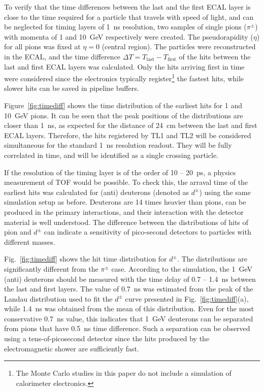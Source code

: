 \documentclass[final,1p,11pt]{elsarticle}
\begin{document}
To verify that the time differences between the last and the first ECAL layer is close to the time
required for a particle that travels with speed of light, and can be neglected for timing layers of 1~ns resolution,
  two samples of single pions ($\pi^\pm$) with momenta of 1 and 10~GeV respectively were created. The
 pseudorapidity ($\eta$) for all pions was fixed at $\eta=0$ (central region). 
The particles were reconstructed in the ECAL, and the time difference $\Delta T= T_{\mathrm{last}}-T_{\mathrm{first}}$ of the hits 
 between the last and first ECAL layers was calculated.
Only the hits arriving first in time were considered since the electronics typically register\footnote{The Monte Carlo studies in
 this paper do not include a simulation of calorimeter electronics.} the fastest hits, while slower hits can be saved in pipeline buffers.

Figure~\ref{fig:timediff} shows the time distribution of the earliest hits 
for 1 and 10~GeV pions. It can be seen that the peak positions of the distributions are closer 
than 1~ns, as expected for the distance of 24~cm between the last and first ECAL layers.
Therefore, the hits registered by TL1 and TL2 will be considered simultaneous for the
standard 1~ns resolution readout. They will be fully correlated in time, and will be identified as a single crossing particle.

If the resolution of the timing layer is of the order of 10 -- 20~ps, a physics measurement of TOF would be possible.
To check this, the arraval time of the earliest hits was calculated for (anti) deuterons (denoted as $d^{\pm}$) using the same
simulation setup as before.
Deuterons are 14 times heavier than pions, can be produced in the primary interactions, 
and their interaction with the detector material is well understood.  
The difference between the distributions of hits of pion and $d^{\pm}$ can indicate
a sensitivity of pico-second detectors to particles with different masses. 
 
 
Fig.~\ref{fig:timediff} shows the hit time distribution for $d^{\pm}$. 
The distributions are significantly different from the $\pi^{\pm}$ case. According to the simulation, the 1~GeV
(anti) deuterons should be measured with the time delay of 0.7 -- 1.4~ns between the last and first layers.
The value of 0.7~ns was estimated from the peak of the Landau distribution used to fit the $d^{\pm}$ 
curve presented in Fig.~\ref{fig:timediff}(a),
while 1.4~ns was obtained from the mean of this distribution. Even for the most conservative 0.7~ns value, this indicates 
that 1~GeV deuterons can be separated from pions that have 0.5~ns time difference. Such a separation can be observed 
using a tens-of-picosecond detector since the hits produced by the electromagnetic shower
are sufficiently fast.
\end{document}
